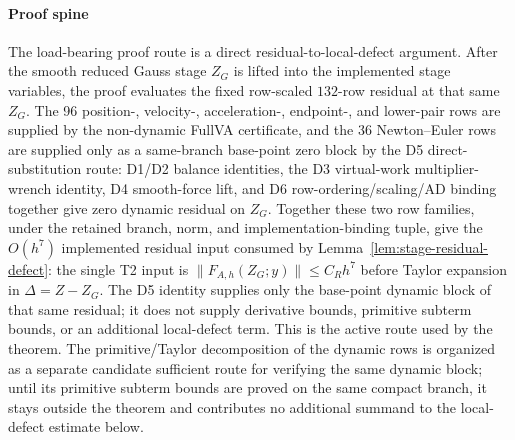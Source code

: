 \documentclass[preprint,12pt]{elsarticle}
\begin{document}
\paragraph{Proof spine}
The load-bearing proof route is a direct residual-to-local-defect argument.
After the smooth reduced Gauss stage \(Z_G\) is lifted into the implemented
stage variables, the proof evaluates the fixed row-scaled \(132\)-row residual
at that same \(Z_G\).  The 96 position-, velocity-, acceleration-, endpoint-,
and lower-pair rows are supplied by the non-dynamic FullVA certificate, and
the 36 Newton--Euler rows are supplied only as a same-branch base-point zero
block by the D5 direct-substitution route:
D1/D2 balance identities, the D3 virtual-work multiplier-wrench identity,
D4 smooth-force lift, and D6 row-ordering/scaling/AD binding together give
zero dynamic residual on \(Z_G\).
Together these two row families, under the retained branch, norm, and
implementation-binding tuple, give the \(O(h^7)\) implemented residual input
consumed by Lemma~\ref{lem:stage-residual-defect}: the single T2 input is
\(\|F_{A,h}(Z_G;y)\|\le C_Rh^7\) before Taylor expansion in
\(\Delta=Z-Z_G\).  The D5 identity supplies only the base-point dynamic block
of that same residual; it does not supply derivative bounds, primitive
subterm bounds, or an additional local-defect term.  This is the active route
used by the theorem.  The primitive/Taylor decomposition of the dynamic rows is
organized as a separate candidate sufficient route for verifying the same
dynamic block; until its primitive subterm bounds are proved on the same
compact branch, it stays outside the theorem and contributes no additional
summand to the local-defect estimate below.
\end{document}
